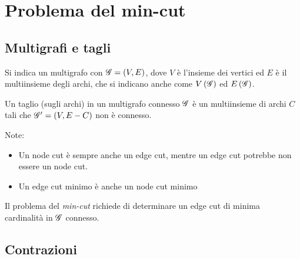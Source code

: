 \section{Problema del min-cut}

\subsection{Multigrafi e tagli}

Si indica un multigrafo con $
\mathscr{G}{}
=
\left( V, E \right)
$, dove $V$ è l'insieme dei vertici ed $E$ è il multiinsieme degli archi,
che si indicano anche come $
V \left( \mathscr{G}{} \right)
$ ed $
E \left( \mathscr{G}{} \right)
$.

\begin{definition}
    \label{def:edge_cut}
    Un taglio (sugli archi) in un multigrafo connesso $
    \mathscr{G}{}
    $ è un multiinsieme di archi $C$ tali che $
    \mathscr{G}{}' = \left( V, E-C \right)
    $ non è connesso.
\end{definition}
Note:
\begin{itemize}
    \item Un node cut è sempre anche un edge cut, mentre un edge cut potrebbe non essere un node cut.
    \item Un edge cut minimo è anche un node cut minimo
\end{itemize}

Il problema del \emph{min-cut} richiede di determinare un edge cut di minima cardinalità in $
\mathscr{G}{}
$ connesso.

\subsection{Contrazioni}

